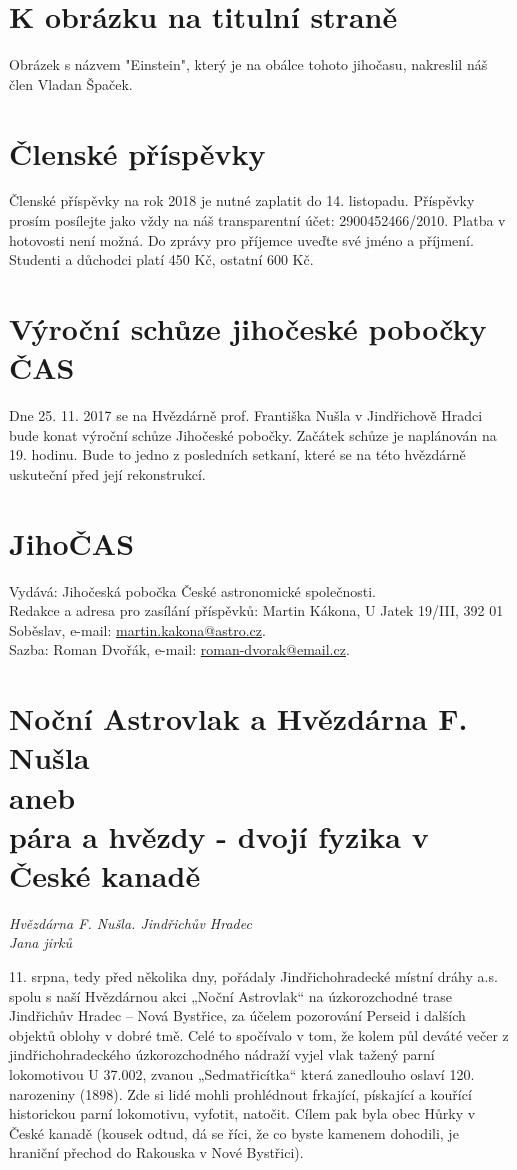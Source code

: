 \documentclass[10pt,a5paper,twoside]{book}
\newcommand{\nadpis}[2]{
\section*{#1}
	\begin{flushright}
	\textit{#2}
	\end{flushright}
}
\begin{document}
 

\section*{K obrázku na titulní straně}
Obrázek s názvem "Einstein", který je na obálce tohoto jihočasu, nakreslil náš člen Vladan Špaček.\vfill
\section*{Členské příspěvky}
Členské příspěvky na rok 2018 je nutné zaplatit do 14. listopadu. Příspěvky prosím posílejte jako vždy na náš transparentní účet: 2900452466/2010. Platba v hotovosti není možná. Do zprávy pro příjemce uveďte své jméno a příjmení. Studenti a důchodci platí 450 Kč, ostatní 600 Kč.

\section*{Výroční schůze jihočeské pobočky ČAS}
Dne 25. 11. 2017 se na Hvězdárně prof. Františka Nušla v Jindřichově Hradci bude konat výroční schůze Jihočeské pobočky. Začátek schůze je naplánován na 19. hodinu. Bude to jedno z posledních setkaní, které se na této hvězdárně uskuteční před její rekonstrukcí.

\section*{JihoČAS}
Vydává: Jihočeská pobočka České astronomické společnosti.\\
Redakce a adresa pro zasílání příspěvků: Martin Kákona, U Jatek 19/III, 392 01 Soběslav, e-mail: \href{mailto:martin.kakona@astro.cz}{martin.kakona@astro.cz}.\\
Sazba: Roman Dvořák, e-mail: \href{mailto:roman-dvorak@email.cz}{roman-dvorak@email.cz}.\newpage

\nadpis{Noční Astrovlak a Hvězdárna F. Nušla\\aneb\\pára a hvězdy - dvojí fyzika v České kanadě}{Hvězdárna F. Nušla. Jindřichův Hradec\\Jana jirků}


11. srpna, tedy před několika dny, pořádaly Jindřichohradecké místní dráhy a.s. spolu s naší Hvězdárnou akci „Noční Astrovlak“ na úzkorozchodné trase Jindřichův Hradec – Nová Bystřice, za účelem pozorování Perseid i dalších objektů oblohy v dobré tmě. Celé to spočívalo v tom, že kolem půl deváté večer z jindřichohradeckého úzkorozchodného nádraží vyjel vlak tažený parní lokomotivou U 37.002, zvanou „Sedmatřicítka“ která zanedlouho oslaví 120. narozeniny (1898). Zde si lidé mohli prohlédnout frkající, pískající a kouřící historickou parní lokomotivu, vyfotit, natočit. Cílem pak byla obec Hůrky v České kanadě (kousek odtud, dá se říci, že co byste kamenem dohodili, je hraniční přechod do Rakouska v Nové Bystřici).
\end{document}
